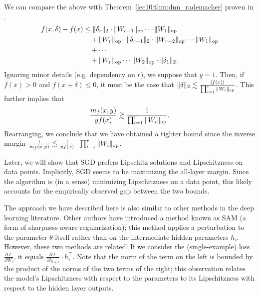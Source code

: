 \begin{remark}\label{remark:1}
	We can compare the above with Theorem~\ref{lec10:thm:dnn_rademacher} proven in \cite{bartlett2017}.
	\begin{equation}
	\begin{split}
	f(x, \delta) - f(x) &\leq \|\delta_r\|_2 \cdot \|W_{r-1}\|_{\text{op}} \cdots \|W_1\|_{\text{op}} \\
	&\quad + \|W_r\|_{\text{op}} \cdot \|\delta_{r-1}\|_2 \cdot \|W_{r - 2}\|_{\text{op}} \cdots \|W_1\|_{\text{op}} \\
	&\quad + \cdots  \\
	&\quad + \|W_r\|_{\text{op}} \cdots \|W_2\|_{\text{op}} \cdot \|\delta_1\|_2.
	\end{split}
	\end{equation}
	Ignoring minor details (e.g. dependency on $r$), we suppose that $y = 1$. Then, if $f(x) > 0$ and $f(x + \delta) \leq 0$, it must be the case that $\|\delta\|_2 \lesssim \frac{|f(x)|}{\prod_{i = 1}^r \|W_i\|_{\text{op}}}$. This further implies that 
	\begin{align}
	\frac{m_f(x, y)}{y f(x)} \gtrsim \frac{1}{\prod_{i = 1}^r \|W_i\|_{\text{op}}}.
	\end{align}
	Rearranging, we conclude that we have obtained a tighter bound since the inverse margin $\frac{1}{m_f(x, y)} \lesssim \frac{1}{yf(x)} \cdot \prod_{i = 1}^r \|W_i\|_{\text{op}}$.
\end{remark}

\begin{remark}
	Later, we will show that SGD prefers Lipschitz solutions and Lipschitzness on data points.
	Implicitly, SGD seems to be maximizing the all-layer margin. Since the algorithm is (in a sense) minimizing Lipschitzness on a data point, this likely accounts for the empirically observed gap between the two bounds. 
\end{remark}

\begin{remark}
	The approach we have described here is also similar to other methods in the deep learning literature. Other authors have introduced a method known as SAM (a form of sharpness-aware regularization); this method applies a perturbation to the parameter $\theta$ itself rather than on the intermediate hidden parameters $h_i$. However, these two methods are related! If we consider the (single-example) loss $\frac{\partial \ell}{\partial W_i}$, it equals $\frac{\partial \ell}{\partial h_{i+1}} \cdot h_i^\top$. Note that the norm of the term on the left is bounded by the product of the norms of the two terms of the right; this observation relates the model's Lipschitzness with respect to the parameters to its Lipschitzness with respect to the hidden layer outputs.
\end{remark}

